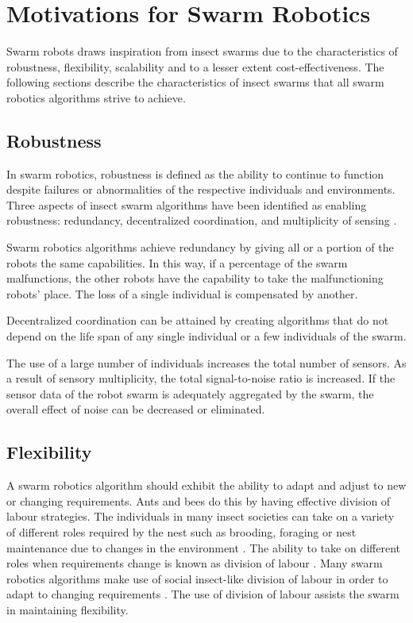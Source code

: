 \section{Motivations for Swarm Robotics}
\label{motivations}

Swarm robots draws inspiration from insect swarms due to the characteristics of robustness, flexibility, scalability and to a lesser extent cost-effectiveness. The following sections describe the characteristics of insect swarms that all swarm robotics algorithms strive to achieve. 

\subsection{Robustness}
\label{robustness}


In swarm robotics, robustness is defined as the ability to continue to function despite failures or abnormalities of the respective individuals and environments. Three aspects of insect swarm algorithms have been identified as enabling robustness: redundancy, decentralized coordination, and multiplicity of sensing \cite{csahin2005swarm}.

Swarm robotics algorithms achieve redundancy by giving all or a portion of the robots the same capabilities. In this way, if a percentage of the swarm malfunctions, the other robots have the capability to take the malfunctioning robots' place. The loss of a single individual is compensated by another.

Decentralized coordination can be attained by creating algorithms that do not depend on the life span of any single individual or a few individuals of the swarm.

The use of a large number of individuals increases the total number of sensors.  As a result of sensory multiplicity, the total signal-to-noise ratio is increased. If the sensor data of the robot swarm is adequately aggregated by the swarm, the overall effect of noise can be decreased or eliminated. 

\subsection{Flexibility}

A swarm robotics algorithm should exhibit the ability to adapt and adjust to new or changing requirements. Ants and bees do this by having effective division of labour strategies. The individuals in many insect societies can take on a variety of different roles required by the nest such as brooding, foraging or nest maintenance due to changes in the environment \cite{morley1946division}. The ability to take on different roles when requirements change is known as division of labour \cite{beshers2001models}. Many swarm robotics algorithms make use of social insect-like division of labour in order to adapt to changing requirements  \cite{gerkey2004formal, labella2006division, liu2007towards}. The use of division of labour assists the swarm in maintaining flexibility.

